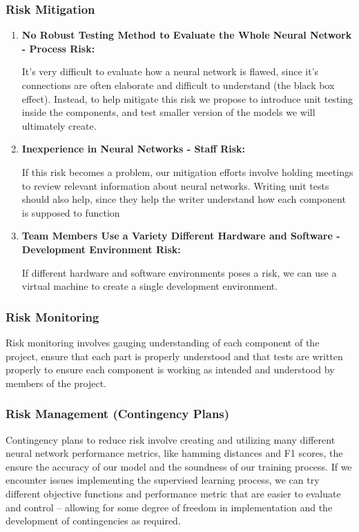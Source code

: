 \documentclass[english,12pt]{article}
\begin{document}
\subsubsection{Risk Mitigation}
\begin{enumerate}[1.]
  \item \textbf{No Robust Testing Method to Evaluate the Whole Neural Network - Process Risk:}

  It's very difficult to evaluate how a neural network is flawed, since it's connections
  are often elaborate and difficult to understand (the black box effect). Instead, to help mitigate this risk we propose to introduce unit testing inside the components, and test smaller version
  of the models we will ultimately create.

  \item \textbf{Inexperience in Neural Networks - Staff Risk:}

  If this risk becomes a problem, our mitigation efforts involve
  holding meetings to review relevant information about neural networks. 
  Writing unit tests should also help, since they help the writer understand
  how each component is supposed to function

  \item \textbf{Team Members Use a Variety Different Hardware and Software 
  - Development Environment Risk:}
  
 If different hardware and software environments poses a risk, we can use a virtual machine
 to create a single development environment.
 
\end{enumerate}
\subsubsection{Risk Monitoring}
Risk monitoring involves gauging understanding of each component of the project, ensure
that each part is properly understood and that tests are written properly to ensure each component
is working as intended and understood by members of the project.

\subsubsection{Risk Management (Contingency Plans)}
Contingency plans to reduce risk involve creating and utilizing many different
neural network performance metrics, like hamming distances and F1 scores, the ensure
the accuracy of our model and the soundness of our training process. If we encounter
issues implementing the supervised learning process, we can try different objective
functions and performance metric that are easier to evaluate and control -- allowing
for some degree of freedom in implementation and the development of contingencies
as required.
\end{document}
